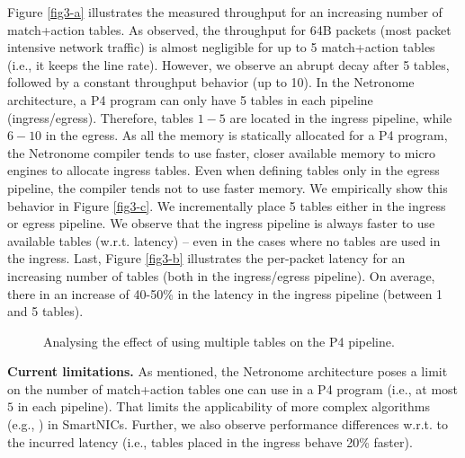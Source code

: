 Figure \ref{fig3-a} illustrates the measured throughput for an increasing number of match+action tables. As observed, the throughput for 64B packets (most packet intensive network traffic) is almost negligible for up to 5 match+action tables (i.e., it keeps the line rate). However, we observe an abrupt decay after 5 tables, followed by a constant throughput behavior (up to 10). In the Netronome architecture, a P4 program can only have 5 tables in each pipeline (ingress/egress). Therefore, tables $1-5$ are located in the ingress pipeline, while $6-10$ in the egress. As all the memory is statically allocated for a P4 program, the Netronome compiler tends to use faster, closer available memory to micro engines to allocate ingress tables. Even when defining tables only in the egress pipeline, the compiler tends not to use faster memory. We empirically show this behavior in Figure \ref{fig3-c}. We incrementally place 5 tables either in the ingress or egress pipeline. We observe that the ingress pipeline is always faster to use available tables (w.r.t. latency) -- even in the cases where no tables are used in the ingress. Last, Figure \ref{fig3-b} illustrates the per-packet latency for an increasing number of tables (both in the ingress/egress pipeline). On average, there in an increase of 40-50\% in the latency in the ingress pipeline (between 1 and 5 tables).\\



\begin{figure}[!tb]
\centering
{}
        \caption{Analysing the effect of using multiple tables on the P4 pipeline.}
        \label{fig3}
\end{figure}


\noindent \textbf{Current limitations.} As mentioned, the Netronome architecture poses a limit on the number of match+action tables one can use in a P4 program (i.e., at most $5$ in each pipeline). That limits the applicability of more complex algorithms (e.g., \cite{harkous2019towards}) in SmartNICs. Further, we also observe performance differences w.r.t. to the incurred latency (i.e., tables placed in the ingress behave 20\% faster). %


